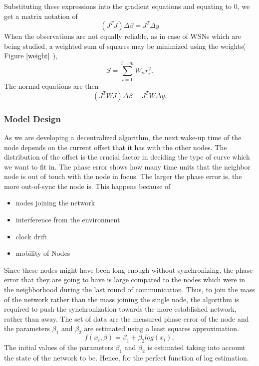 \documentclass[a4paper,10pt]{report}
\begin{document}
Substituting these expressions into the gradient equations and equating to $0$, we get a matrix notation of
\begin{equation}
    \left(J^TJ\right)\Delta  \beta=J^T\Delta y
\end{equation}
When the observations are not equally reliable, as in case of WSNs which are being studied, a weighted sum of squares may be minimized
using the weights( Figure $\ref{weight}$ ),
\begin{equation}
    S=\sum_{i=1}^{i=m}W_{ii}r_i^2.
\end{equation}
The normal equations are then
\begin{equation}
    \left(J^TWJ\right)\Delta  \beta=J^TW\Delta y.
\end{equation}
\subsubsection{Model Design}
As we are developing a decentralized algorithm, the next wake-up time of the node depends on the current offset that it has with the other nodes. The distribution of the offset is the crucial factor in deciding the type of curve which we want to fit in. The phase error shows how many time units that the neighbor node is out of touch with the node in focus. The larger the phase error is, the more out-of-sync the node is. This happens because of
\begin{itemize}
\item nodes joining the network
\item interference from the environment
\item clock drift
\item mobility of Nodes
\end{itemize}
Since these nodes might have been long enough without synchronizing, the phase error that they are going to have is large compared to the
nodes which were in the neighborhood during the last round of communication. Thus, to join the mass of the network rather than the
mass joining the single node, the algorithm is required to push the synchronization towards the more established network, rather than
away.\newline
The set of data are the measured phase error of the node and the parameters $\beta_1$ and $\beta_2$ are estimated using a least
squares approximation.
\begin{equation}
 f(x_i,\beta)= \beta _1 + \beta_2log(x_i),
\end{equation}
The initial values of the parameters $\beta_1$ and $\beta_2$ is estimated taking into account the state of the network to be. Hence, for the perfect function of log estimation.
\end{document}

